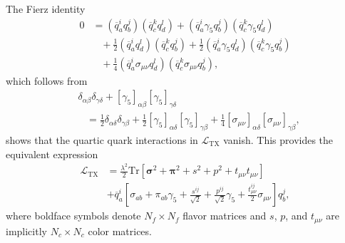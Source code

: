\documentclass[%
    twocolumn,
superscriptaddress,
preprintnumbers,
nofootinbib,
 amsmath,amssymb,
 aps,
 prd,
 floatfix,
]{revtex4-2}
\newcommand{\tx}[0]{\text{TX}}
\begin{document}
The Fierz identity
\begin{equation}
\begin{split}
    0 &= (\overline{q}^i_a q^j_b)(\overline{q}^k_c  q^l_d) + (\overline{q}^i_a  \gamma_5 q^j_b)(\overline{q}^k_c  \gamma_5 q^l_d)  \\
    &\hspace{10pt} + \frac{1}{2} (\overline{q}^i_a q^l_d)(\overline{q}^k_c q^j_b) + \frac{1}{2}  (\overline{q}^i_a \gamma_5 q^l_d)(\overline{q}^k_c \gamma_5 q^j_b) \\
    &\hspace{10pt} + \frac{1}{4} (\overline{q}^i_a \sigma_{\mu\nu} q^l_d)(\overline{q}^k_c \sigma_{\mu\nu} q^j_b) ,
    \end{split}
\end{equation}
which follows from
\begin{equation}
\begin{split}
    &\delta_{
    \alpha\beta} \delta_{\gamma\delta} + [\gamma_5]_{\alpha\beta}[\gamma_5]_{\gamma\delta} \\
    &\hspace{10pt} = \frac{1}{2} \delta_{\alpha\delta} \delta_{\gamma\beta} + \frac{1}{2} [\gamma_5]_{\alpha\delta}[\gamma_5]_{\gamma\beta} + \frac{1}{4} [\sigma_{\mu\nu}]_{\alpha\delta}[\sigma_{\mu\nu}]_{\gamma\beta},
    \end{split}
\end{equation}
shows that the quartic quark interactions in $\mathcal{L}_{\tx}$ vanish. This provides the equivalent expression
\begin{equation}
\begin{split}
    \mathcal{L}_{\tx} &= \frac{\lambda^2}{2}\text{Tr}
    [\bm{\sigma}^2 + \bm{\pi}^2 + s^2 + p^2 + t_{\mu\nu} t_{\mu\nu}] \\
    & + \overline{q}^i_a\left[ \sigma_{ab} + \pi_{ab}\gamma_5 + \frac{s^{ij}}{\sqrt{2}}  + \frac{p^{ij}}{\sqrt{2}}  \gamma_5 + \frac{t_{\mu\nu}^{ij}}{2}  \sigma_{\mu\nu}    \right]q^j_b,
    \end{split}
\end{equation}
where boldface symbols denote $N_f \times N_f$ flavor matrices and $s$, $p$, and $t_{\mu\nu}$ are implicitly $N_c \times N_c$ color matrices.
\end{document}
